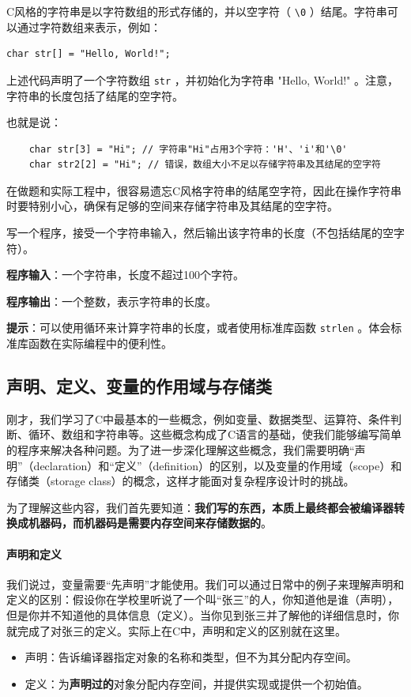 C风格的字符串是以字符数组的形式存储的，并以空字符（ \texttt{\textbackslash 0} ）结尾。字符串可以通过字符数组来表示，例如：
\begin{verbatim}
char str[] = "Hello, World!";
\end{verbatim}
上述代码声明了一个字符数组 \texttt{str} ，并初始化为字符串 "Hello, World!" 。注意，字符串的长度包括了结尾的空字符。

也就是说：
\begin{verbatim}
    char str[3] = "Hi"; // 字符串"Hi"占用3个字符：'H'、'i'和'\0'
    char str2[2] = "Hi"; // 错误，数组大小不足以存储字符串及其结尾的空字符
\end{verbatim}

在做题和实际工程中，很容易遗忘C风格字符串的结尾空字符，因此在操作字符串时要特别小心，确保有足够的空间来存储字符串及其结尾的空字符。

\begin{exercise}[字符串长度]
写一个程序，接受一个字符串输入，然后输出该字符串的长度（不包括结尾的空字符）。

\textbf{程序输入}：一个字符串，长度不超过100个字符。

\textbf{程序输出}：一个整数，表示字符串的长度。

\textbf{提示}：可以使用循环来计算字符串的长度，或者使用标准库函数 \texttt{strlen} 。体会标准库函数在实际编程中的便利性。
\end{exercise}

\subsection{声明、定义、变量的作用域与存储类}

刚才，我们学习了C中最基本的一些概念，例如变量、数据类型、运算符、条件判断、循环、数组和字符串等。这些概念构成了C语言的基础，使我们能够编写简单的程序来解决各种问题。为了进一步深化理解这些概念，我们需要明确“声明”（declaration）和“定义”（definition）的区别，以及变量的作用域（scope）和存储类（storage class）的概念，这样才能面对复杂程序设计时的挑战。

为了理解这些内容，我们首先要知道：\textbf{我们写的东西，本质上最终都会被编译器转换成机器码，而机器码是需要内存空间来存储数据的}。

\paragraph{声明和定义}

我们说过，变量需要“先声明”才能使用。我们可以通过日常中的例子来理解声明和定义的区别：假设你在学校里听说了一个叫“张三”的人，你知道他是谁（声明），但是你并不知道他的具体信息（定义）。当你见到张三并了解他的详细信息时，你就完成了对张三的定义。实际上在C中，声明和定义的区别就在这里。
\begin{itemize}
  \item 声明：告诉编译器指定对象的名称和类型，但不为其分配内存空间。
  \item 定义：为\textbf{声明过的}对象分配内存空间，并提供实现或提供一个初始值。
\end{itemize}

